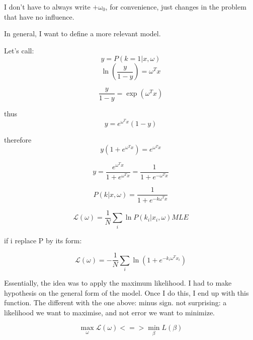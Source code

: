 \documentclass[a4paper]{tufte-book}
\begin{document}
I don't have to always write $+\omega_0$, for convenience, just changes in the
problem that have no influence.

In general, I want to define a more relevant model.

Let's call:
\begin{equation}
    y=P(k=1|x,\omega)
\end{equation}
\begin{equation}
    \ln (\frac{y}{1-y}) = \omega^T x
\end{equation}

\begin{equation}
    \frac{y}{1-y} = \exp (\omega^T x)
\end{equation}

thus
\begin{equation}
    y = e^{\omega^T x} (1-y)
\end{equation}

therefore
\begin{equation}
    y(1+e^{\omega^T x}) = e^{\omega^T x}
\end{equation}

\begin{equation}
    y = \frac{e^{\omega^T x}}{1+e^{\omega^Tx}} = \frac{1}{1+e^{-\omega^T x}}
\end{equation}

\begin{equation}
    P(k|x,\omega) = \frac{1}{1+e^{-k\omega^T x}}
\end{equation}


\begin{equation}
    \mathcal{L}(\omega) = \frac{1}{N} \sum_i \ln P(k_i |x_i,\omega) MLE
\end{equation}

if i replace P by its form:

\begin{equation}
    \mathcal{L}(\omega) = - \frac{1}{N} \sum_i \ln (1 + e^{-k_i \omega^T x_i})
\end{equation}

Essentially, the idea was to apply the maximum likelihood. I had to make 
hypothesis on the general form of the model. Once I do this, I
end up with this function. The different with the one above:  minus sign.
not surprising: a likelihood we want to maximise, and not error we want to
minimize.

\begin{equation}
    \max_\omega \mathcal{L}(\omega) <=> \min_\beta L(\beta)
\end{equation}
\end{document}
